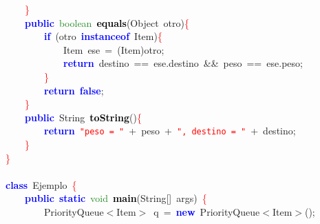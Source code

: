 {{\mbox{}\ \ \ \ \textcolor{Red}{\}} \\
\mbox{}\ \ \ \ \textbf{\textcolor{Blue}{public}}\ \textcolor{ForestGreen}{boolean}\ \textbf{\textcolor{Black}{equals}}\textcolor{BrickRed}{(}Object\ otro\textcolor{BrickRed}{)}\textcolor{Red}{\{} \\
\mbox{}\ \ \ \ \ \ \ \ \textbf{\textcolor{Blue}{if}}\ \textcolor{BrickRed}{(}otro\ \textbf{\textcolor{Blue}{instanceof}}\ Item\textcolor{BrickRed}{)}\textcolor{Red}{\{} \\
\mbox{}\ \ \ \ \ \ \ \ \ \ \ \ Item\ ese\ \textcolor{BrickRed}{=}\ \textcolor{BrickRed}{(}Item\textcolor{BrickRed}{)}otro\textcolor{BrickRed}{;} \\
\mbox{}\ \ \ \ \ \ \ \ \ \ \ \ \textbf{\textcolor{Blue}{return}}\ destino\ \textcolor{BrickRed}{==}\ ese\textcolor{BrickRed}{.}destino\ \textcolor{BrickRed}{\&\&}\ peso\ \textcolor{BrickRed}{==}\ ese\textcolor{BrickRed}{.}peso\textcolor{BrickRed}{;} \\
\mbox{}\ \ \ \ \ \ \ \ \textcolor{Red}{\}} \\
\mbox{}\ \ \ \ \ \ \ \ \textbf{\textcolor{Blue}{return}}\ \textbf{\textcolor{Blue}{false}}\textcolor{BrickRed}{;} \\
\mbox{}\ \ \ \ \textcolor{Red}{\}} \\
\mbox{}\ \ \ \ \textbf{\textcolor{Blue}{public}}\ String\ \textbf{\textcolor{Black}{toString}}\textcolor{BrickRed}{()}\textcolor{Red}{\{} \\
\mbox{}\ \ \ \ \ \ \ \ \textbf{\textcolor{Blue}{return}}\ \texttt{\textcolor{Red}{"{}peso\ =\ "{}}}\ \textcolor{BrickRed}{+}\ peso\ \textcolor{BrickRed}{+}\ \texttt{\textcolor{Red}{"{},\ destino\ =\ "{}}}\ \textcolor{BrickRed}{+}\ destino\textcolor{BrickRed}{;} \\
\mbox{}\ \ \ \ \textcolor{Red}{\}} \\
\mbox{}\textcolor{Red}{\}} \\
\mbox{} \\
\mbox{}\textbf{\textcolor{Blue}{class}}\ Ejemplo\ \textcolor{Red}{\{} \\
\mbox{}\ \ \ \ \textbf{\textcolor{Blue}{public}}\ \textbf{\textcolor{Blue}{static}}\ \textcolor{ForestGreen}{void}\ \textbf{\textcolor{Black}{main}}\textcolor{BrickRed}{(}String\textcolor{BrickRed}{[]}\ args\textcolor{BrickRed}{)}\ \textcolor{Red}{\{} \\
\mbox{}\ \ \ \ \ \ \ \ PriorityQueue\textcolor{BrickRed}{$<$}Item\textcolor{BrickRed}{$>$}\ q\ \textcolor{BrickRed}{=}\ \textbf{\textcolor{Blue}{new}}\ PriorityQueue\textcolor{BrickRed}{$<$}Item\textcolor{BrickRed}{$>$();} \\
}}
